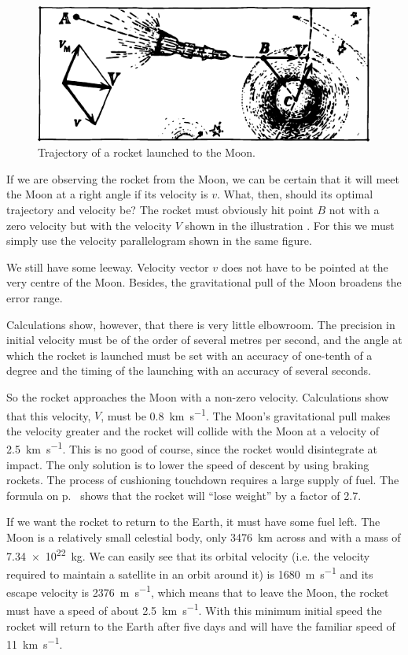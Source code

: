 \begin{figure}[!ht]
\centering
\includegraphics[width=\textwidth]{figures/fig-6-9.pdf}
\caption{Trajectory of a rocket launched to the Moon.}
\label{fig-6-9}
\end{figure}

If we are observing the rocket from the Moon, we can
be certain that it will meet the Moon at a right angle
if its velocity is $v$. What, then, should its optimal trajectory and velocity be? The rocket must obviously hit
point $B$ not with a zero velocity but with the velocity $V$
shown in the illustration . For this we must simply use the
velocity parallelogram shown in the same figure.

We still have some leeway. Velocity vector $v$ does
not have to be pointed at the very centre of the Moon.
Besides, the gravitational pull of the Moon broadens
the error range.

Calculations show, however, that there is very little
elbowroom. The precision in initial velocity must be of
the order of several metres per second, and the angle at
which the rocket is launched must be set with an accuracy
of one-tenth of a degree and the timing of the launching
with an accuracy of several seconds.

So the rocket approaches the Moon with a non-zero velocity. Calculations show that this velocity, $V$, must be \SI{0.8}{\kilo\meter\per\second}. The Moon's gravitational pull makes the velocity greater and the rocket will collide with the Moon
at a velocity of \SI{2.5}{\kilo\meter\per\second}. This is no good of course, since the rocket would disintegrate at impact. The only solution is to lower the speed of descent by using braking rockets. The process of cushioning touchdown requires
a large supply of fuel. The formula on p.~\pageref{rocket-eq} shows that the rocket will ``lose weight'' by a factor of 2.7.

If we want the rocket to return to the Earth, it must have some fuel left. The Moon is a relatively small celestial body, only \SI{3476}{\kilo\meter} across and with a mass of \SI{7.34e22}{\kilo\gram}. We can easily see that its orbital velocity (i.e. the velocity required to maintain a satellite in an orbit around it) is \SI{1680}{\meter\per\second} and its escape velocity is \SI{2376}{\meter\per\second}, which means that to leave the Moon, the rocket must have a speed of about \SI{2.5}{\kilo\meter\per\second}. With this minimum initial speed the rocket will return to the Earth after five days and will have the familiar speed
of \SI{11}{\kilo\meter\per\second}.

